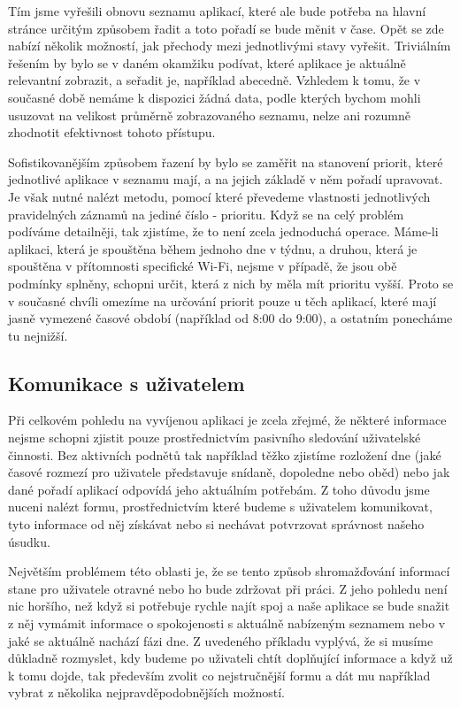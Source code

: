 \documentclass[thesis=M,czech]{FITthesis}[2012/06/26]
\begin{document}
Tím jsme vyřešili obnovu seznamu aplikací, které ale bude potřeba na hlavní stránce určitým způsobem řadit a toto pořadí se bude měnit v čase. Opět se zde nabízí několik možností, jak přechody mezi jednotlivými stavy vyřešit. Triviálním řešením by bylo se v daném okamžiku podívat, které aplikace je aktuálně relevantní zobrazit, a seřadit je, například abecedně. Vzhledem k tomu, že v současné době nemáme k dispozici žádná data, podle kterých bychom mohli usuzovat na velikost průměrně zobrazovaného seznamu, nelze ani rozumně zhodnotit efektivnost tohoto přístupu.

Sofistikovanějším způsobem řazení by bylo se zaměřit na stanovení priorit, které jednotlivé aplikace v seznamu mají, a na jejich základě v něm pořadí upravovat. Je však nutné nalézt metodu, pomocí které převedeme vlastnosti jednotlivých pravidelných záznamů na jediné číslo - prioritu. Když se na celý problém podíváme detailněji, tak zjistíme, že to není zcela jednoduchá operace. Máme-li aplikaci, která je spouštěna během jednoho dne v týdnu, a druhou, která je spouštěna v přítomnosti specifické Wi-Fi, nejsme v případě, že jsou obě podmínky splněny, schopni určit, která z nich by měla mít prioritu vyšší. Proto se v současné chvíli omezíme na určování priorit pouze u těch aplikací, které mají jasně vymezené časové období (například od 8:00 do 9:00), a ostatním ponecháme tu nejnižší.

\subsection{Komunikace s uživatelem}
Při celkovém pohledu na vyvíjenou aplikaci je zcela zřejmé, že některé informace nejsme schopni zjistit pouze prostřednictvím pasivního sledování uživatelské činnosti. Bez aktivních podnětů tak například těžko zjistíme rozložení dne (jaké časové rozmezí pro uživatele představuje snídaně, dopoledne nebo oběd) nebo jak dané pořadí aplikací odpovídá jeho aktuálním potřebám. Z toho důvodu jsme nuceni nalézt formu, prostřednictvím které budeme s uživatelem komunikovat, tyto informace od něj získávat nebo si nechávat potvrzovat správnost našeho úsudku.

Největším problémem této oblasti je, že se tento způsob shromažďování informací stane pro uživatele otravné nebo ho bude zdržovat při práci. Z jeho pohledu není nic horšího, než když si potřebuje rychle najít spoj a naše aplikace se bude snažit z něj vymámit informace o spokojenosti s aktuálně nabízeným seznamem nebo v jaké se aktuálně nachází fázi dne. Z uvedeného příkladu vyplývá, že si musíme důkladně rozmyslet, kdy budeme po uživateli chtít doplňující informace a když už k tomu dojde, tak především zvolit co nejstručnější formu a dát mu například vybrat z několika nejpravděpodobnějších možností.
\end{document}
